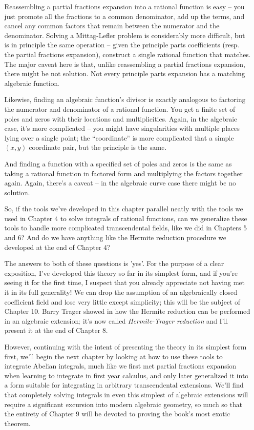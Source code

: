 Reassembling a partial fractions expansion into a rational function is
easy -- you just promote all the fractions to a common denominator,
add up the terms, and cancel any common factors that remain between
the numerator and the denominator.  Solving a Mittag-Lefler problem is
considerably more difficult, but is in principle the same operation --
given the principle parts coefficients (resp. the partial fractions
expansion), construct a single rational function that matches.  The
major caveat here is that, unlike reassembling a partial fractions
expansion, there might be not solution.  Not every principle parts
expansion has a matching algebraic function.

Likewise, finding an algebraic function's divisor is exactly analogous
to factoring the numerator and denominator of a rational function.
You get a finite set of poles and zeros with their locations and
multiplicities.  Again, in the algebraic case, it's more complicated --
you might have singularities with multiple places lying over a single
point; the ``coordinate'' is more complicated that a simple $(x,y)$
coordinate pair, but the principle is the same.

And finding a function with a specified set of poles and zeros is the
same as taking a rational function in factored form and multiplying
the factors together again.  Again, there's a caveat -- in the
algebraic curve case there might be no solution.

So, if the tools we've developed in this chapter parallel neatly with
the tools we used in Chapter 4 to solve integrals of rational
functions, can we generalize these tools to handle more complicated
transcendental fields, like we did in Chapters 5 and 6?  And do we
have anything like the Hermite reduction procedure we developed at the
end of Chapter 4?

The answers to both of these questions is 'yes'.  For the purpose of a
clear exposition, I've developed this theory so far in its simplest
form, and if you're seeing it for the first time, I suspect that you
already appreciate not having met it in its full generality!  We can
drop the assumption of an algebraically closed coefficient field and
lose very little except simplicity; this will be the subject of
Chapter 10.  Barry Trager showed in \cite{trager} how the Hermite
reduction can be performed in an algebraic extension; it's now called
{\it Hermite-Trager reduction} and I'll present it at the end of
Chapter 8.

However, continuing with the intent of presenting the theory in its
simplest form first, we'll begin the next chapter by looking at how to
use these tools to integrate Abelian integrals, much like we first met
partial fractions expansion when learning to integrate in first year
calculus, and only later generalized it into a form suitable for
integrating in arbitrary transcendental extensions.  We'll find that
completely solving integrals in even this simplest of algebraic
extensions will require a significant excursion into modern algebraic
geometry, so much so that the entirety of Chapter 9 will be devoted to
proving the book's most exotic theorem.


